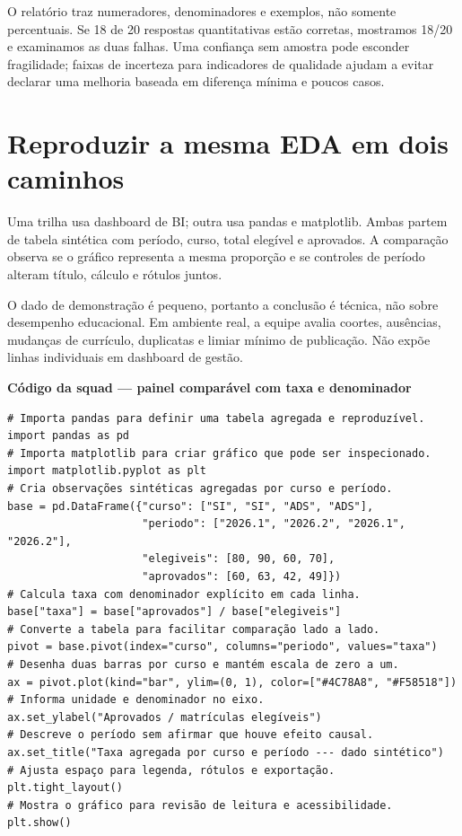 O relatório traz numeradores, denominadores e exemplos, não somente percentuais. Se 18 de 20 respostas quantitativas estão corretas, mostramos 18/20 e examinamos as duas falhas. Uma confiança sem amostra pode esconder fragilidade; faixas de incerteza para indicadores de qualidade ajudam a evitar declarar uma melhoria baseada em diferença mínima e poucos casos.

\section{Reproduzir a mesma EDA em dois caminhos}

Uma trilha usa dashboard de BI; outra usa pandas e matplotlib. Ambas partem de tabela sintética com período, curso, total elegível e aprovados. A comparação observa se o gráfico representa a mesma proporção e se controles de período alteram título, cálculo e rótulos juntos.

O dado de demonstração é pequeno, portanto a conclusão é técnica, não sobre desempenho educacional. Em ambiente real, a equipe avalia coortes, ausências, mudanças de currículo, duplicatas e limiar mínimo de publicação. Não expõe linhas individuais em dashboard de gestão.

\textbf{Código da squad --- painel comparável com taxa e denominador}
\begin{verbatim}
# Importa pandas para definir uma tabela agregada e reproduzível.
import pandas as pd
# Importa matplotlib para criar gráfico que pode ser inspecionado.
import matplotlib.pyplot as plt
# Cria observações sintéticas agregadas por curso e período.
base = pd.DataFrame({"curso": ["SI", "SI", "ADS", "ADS"],
                     "periodo": ["2026.1", "2026.2", "2026.1", "2026.2"],
                     "elegiveis": [80, 90, 60, 70],
                     "aprovados": [60, 63, 42, 49]})
# Calcula taxa com denominador explícito em cada linha.
base["taxa"] = base["aprovados"] / base["elegiveis"]
# Converte a tabela para facilitar comparação lado a lado.
pivot = base.pivot(index="curso", columns="periodo", values="taxa")
# Desenha duas barras por curso e mantém escala de zero a um.
ax = pivot.plot(kind="bar", ylim=(0, 1), color=["#4C78A8", "#F58518"])
# Informa unidade e denominador no eixo.
ax.set_ylabel("Aprovados / matrículas elegíveis")
# Descreve o período sem afirmar que houve efeito causal.
ax.set_title("Taxa agregada por curso e período --- dado sintético")
# Ajusta espaço para legenda, rótulos e exportação.
plt.tight_layout()
# Mostra o gráfico para revisão de leitura e acessibilidade.
plt.show()
\end{verbatim}

